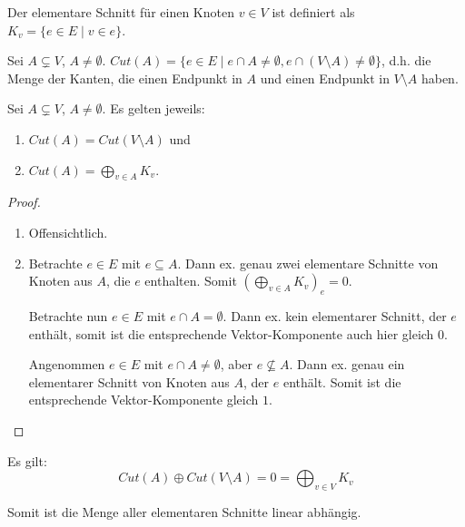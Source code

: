 \begin{definition}
    Der elementare Schnitt für einen Knoten $ v \in V $ ist definiert als $ K_v = \{ e \in E \mid v \in e \} $.
\end{definition}

\begin{definition}[Cut]
    Sei $ A \subsetneq V $, $ A \ne \emptyset $.
    $ Cut(A) = \{ e \in E \mid e \cap A \ne \emptyset, e \cap (V \setminus A) \ne \emptyset \} $, d.h. die Menge der Kanten, die einen Endpunkt in $ A $ und einen Endpunkt in $ V \setminus A $ haben.
\end{definition}

\begin{proposition}
    Sei $ A \subsetneq V $, $ A \ne \emptyset $.
    Es gelten jeweils:
    \begin{enumerate}
        \item $ Cut(A) = Cut(V \setminus A) $ und
        \item $ Cut(A) = \bigoplus_{v \in A} K_v $.
    \end{enumerate}
\end{proposition}

\begin{proof}
    \begin{enumerate}
        \item Offensichtlich.
        \item Betrachte $ e \in E $ mit $ e \subseteq A $.
        Dann ex. genau zwei elementare Schnitte von Knoten aus $ A $, die $ e $ enthalten.
        Somit $ (\bigoplus_{v \in A} K_v)_e = 0 $.

        Betrachte nun $ e \in E $ mit $ e \cap A = \emptyset $.
        Dann ex. kein elementarer Schnitt, der $ e $ enthält, somit ist die entsprechende Vektor-Komponente auch hier gleich $ 0 $.

        Angenommen $ e \in E $ mit $ e \cap A \ne \emptyset $, aber $ e \not \subseteq A $.
        Dann ex. genau ein elementarer Schnitt von Knoten aus $ A $, der $ e $ enthält.
        Somit ist die entsprechende Vektor-Komponente gleich $ 1 $.
    \end{enumerate}
\end{proof}

\begin{corollary}
    Es gilt:
    \begin{equation*}
        Cut(A) \oplus Cut(V \setminus A) = 0 = \bigoplus_{v \in V} K_v
    \end{equation*}

    Somit ist die Menge aller elementaren Schnitte linear abhängig.
\end{corollary}

